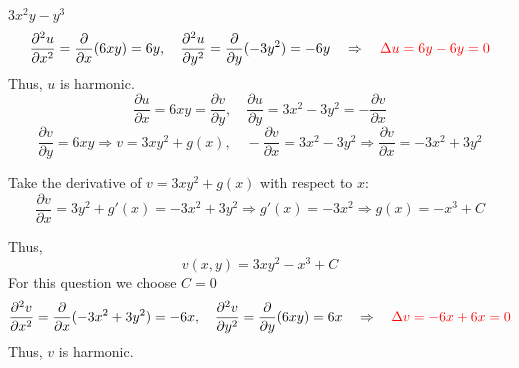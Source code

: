 \item[55.] $3x^2y - y^3$\\
\[
\frac{\partial^2 u}{\partial x^2} = \frac{\partial}{\partial x}(6xy) = 6y, \quad 
\frac{\partial^2 u}{\partial y^2} = \frac{\partial}{\partial y}(-3y^2) = -6y \quad \Rightarrow \quad \textcolor{red}{\Delta u = 6y - 6y = 0}
\]
Thus, $u$ is harmonic.
\[
\frac{\partial u}{\partial x} = 6xy = \frac{\partial v}{\partial y}, \quad 
\frac{\partial u}{\partial y} = 3x^2 - 3y^2 = -\frac{\partial v}{\partial x}
\]
\[
\frac{\partial v}{\partial y} = 6xy \Rightarrow v = 3xy^2 + g(x), \quad
-\frac{\partial v}{\partial x} = 3x^2 - 3y^2 \Rightarrow \frac{\partial v}{\partial x} = -3x^2 + 3y^2
\]

Take the derivative of \( v = 3xy^2 + g(x) \) with respect to \( x \):
\[
\frac{\partial v}{\partial x} = 3y^2 + g'(x) = -3x^2 + 3y^2 \Rightarrow g'(x) = -3x^2
\Rightarrow g(x) = -x^3 + C
\]

Thus,
\[
v(x, y) = 3xy^2 - x^3 + C
\]
For this question we choose $C = 0$
\answer{\[
f(z) =3x^2y - y^3 + i(3xy^2 - x^3)
\]}
\[
\frac{\partial^2 v}{\partial x^2} = \frac{\partial}{\partial x}(-3x^2 + 3y^2) = -6x, \quad 
\frac{\partial^2 v}{\partial y^2} = \frac{\partial}{\partial y}(6xy) = 6x \quad \Rightarrow \quad \textcolor{red}{\Delta v = -6x + 6x = 0}
\]
Thus, $v$ is harmonic.